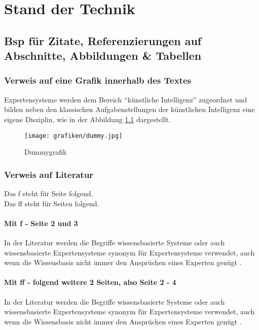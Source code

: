 \chapter{Stand der Technik}
\section{Bsp für Zitate, Referenzierungen auf Abschnitte, Abbildungen \& Tabellen}
\subsection{Verweis auf eine Grafik innerhalb des Textes}
Expertensysteme werden dem Bereich "`künstliche Intelligenz"' zugeordnet und bilden neben den klassischen Aufgabenstellungen der künstlichen Intelligenz eine eigene Disziplin, wie in der Abbildung \ref{fig:dummy} dargestellt. 

\begin{figure}[!h]
	\centering
		\texttt{[image: grafiken/dummy.jpg]}
	\caption{Dummygrafik}
	\label{fig:dummy}
\end{figure}

\subsection{Verweis auf Literatur}
Das f steht für Seite folgend. \\
Das ff steht für Seiten folgend. \\

\subsubsection{Mit f - Seite 2 und 3}
In der Literatur werden die Begriffe wissensbasierte Systeme oder auch wissensbasierte Expertensysteme synonym für Expertensysteme verwendet, auch wenn die Wissensbasis nicht immer den Ansprüchen eines Experten genügt \cite[\vgl][S. 2 f]{GiarratanoRiley:1989}. 

\subsubsection{Mit ff - folgend weitere 2 Seiten, also Seite 2 - 4}
In der Literatur werden die Begriffe wissensbasierte Systeme oder auch wissensbasierte Expertensysteme synonym für Expertensysteme verwendet, auch wenn die Wissensbasis nicht immer den Ansprüchen eines Experten genügt \cite[\vgl][S. 2 ff]{GiarratanoRiley:1989}. 


